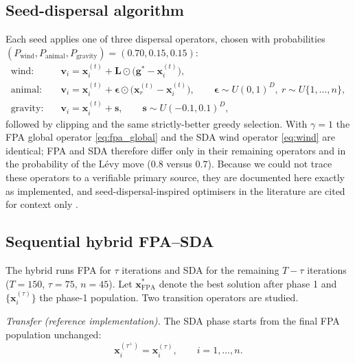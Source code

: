\documentclass[preprint,12pt]{elsarticle}
\begin{document}
\subsection{Seed-dispersal algorithm}
Each seed applies one of three dispersal operators, chosen with probabilities $(P_{\mathrm{wind}},P_{\mathrm{animal}},P_{\mathrm{gravity}})=(0.70,0.15,0.15)$:
\begin{align}
\text{wind:}\quad & \mathbf{v}_i=\mathbf{x}_i^{(t)}+\mathbf{L}\odot\bigl(\mathbf{g}^{*}-\mathbf{x}_i^{(t)}\bigr),\label{eq:wind}\\
\text{animal:}\quad & \mathbf{v}_i=\mathbf{x}_i^{(t)}+\bm{\epsilon}\odot\bigl(\mathbf{x}_r^{(t)}-\mathbf{x}_i^{(t)}\bigr),\qquad \bm{\epsilon}\sim U(0,1)^D,\ r\sim U\{1,\dots,n\},\label{eq:animal}\\
\text{gravity:}\quad & \mathbf{v}_i=\mathbf{x}_i^{(t)}+\mathbf{s},\qquad \mathbf{s}\sim U(-0.1,0.1)^D,\label{eq:gravity}
\end{align}
followed by clipping and the same strictly-better greedy selection. With $\gamma=1$ the FPA global operator \eqref{eq:fpa_global} and the SDA wind operator \eqref{eq:wind} are identical; FPA and SDA therefore differ only in their remaining operators and in the probability of the Lévy move ($0.8$ versus $0.7$). Because we could not trace these operators to a verifiable primary source, they are documented here exactly as implemented, and seed-dispersal-inspired optimisers in the literature are cited for context only \citep{sulaiman2015sbppa,mohammadi2020ffa}.

\subsection{Sequential hybrid FPA--SDA}\label{sec:hybrid}
The hybrid runs FPA for $\tau$ iterations and SDA for the remaining $T-\tau$ iterations ($T=150$, $\tau=75$, $n=45$). Let $\mathbf{x}^{*}_{\mathrm{FPA}}$ denote the best solution after phase 1 and $\{\mathbf{x}_i^{(\tau)}\}$ the phase-1 population. Two transition operators are studied.

\emph{Transfer (reference implementation).} The SDA phase starts from the final FPA population unchanged:
\begin{equation}
\mathbf{x}_i^{(\tau^{+})}=\mathbf{x}_i^{(\tau)},\qquad i=1,\dots,n.
\label{eq:transfer}
\end{equation}
\end{document}
